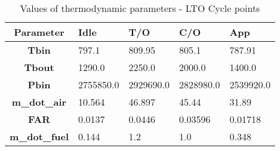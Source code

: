 \begin{table}[h!]
  \centering
  \begin{tabularx}{\textwidth}{||c|X|X|X|X||}
  \hline
    \cellcolor{gray!20}\textbf{Parameter} & \cellcolor{gray!20}\textbf{Idle} & \cellcolor{gray!20}\textbf{T/O} & \cellcolor{gray!20}\textbf{C/O} & \cellcolor{gray!20}\textbf{App} \\ [0.5ex]
  \hline\hline
\centering
    \cellcolor{gray!20}\textbf{Tbin} & 797.1 & 809.95 & 805.1 & 787.91 \\
  \hline
    \cellcolor{gray!20}\textbf{Tbout} & 1290.0 & 2250.0 & 2000.0 & 1400.0 \\
  \hline
    \cellcolor{gray!20}\textbf{Pbin} & 2755850.0 & 2929690.0 & 2828980.0 & 2539920.0 \\
  \hline
    \cellcolor{gray!20}\textbf{m_dot_air} & 10.564 & 46.897 & 45.44 & 31.89 \\
  \hline
    \cellcolor{gray!20}\textbf{FAR} & 0.0137 & 0.0446 & 0.03596 & 0.01718 \\
  \hline
    \cellcolor{gray!20}\textbf{m_dot_fuel} & 0.144 & 1.2 & 1.0 & 0.348 \\
  \hline
  \end{tabularx}
  \caption{Values of thermodynamic parameters - LTO Cycle points}
  \label{tab:Thermo}
\end{table}
